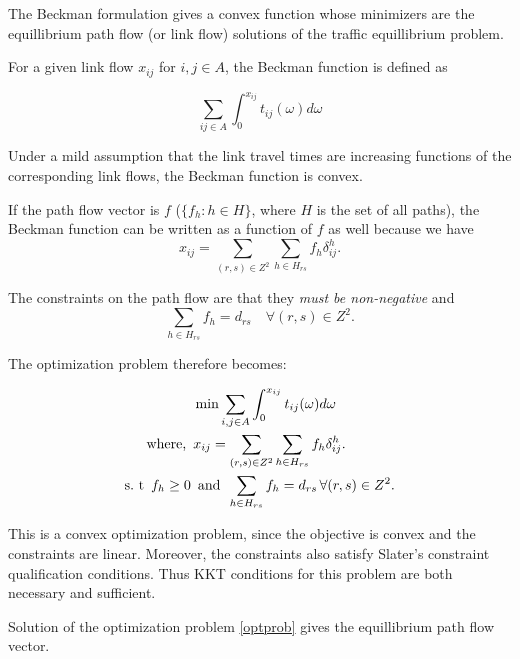 The Beckman formulation gives a convex function whose minimizers
are the equillibrium path flow (or link flow) solutions
of the traffic equillibrium problem.

For a given link flow $x_{ij}$ for $i,j\in A$, the Beckman function
is defined as

\begin{equation}\label{beck}
	\sum_{ij\in A}\int_{0}^{x_{ij}}t_{ij}(\omega)d\omega
\end{equation}

Under a mild assumption that the link travel times 
are increasing functions of the corresponding link flows,
the Beckman function is convex. %

If the path flow vector is $f$ ($\{f_h: h\in H\}$, where $H$ is the
set of all paths), the Beckman function can be written as a function
of $f$ as well because we have
\begin{equation}\label{linktopath}
	x_{ij} = \sum_{(r,s)\in Z^2}\sum_{h\in H_{rs}} f_h \delta_{ij}^h.
\end{equation}

The constraints on the path flow are that they
\emph{must be non-negative} and
\begin{equation}\label{pathconstr}
	\sum_{h\in H_{rs}} f_h = d_{rs} \quad \forall (r,s)\in Z^2.
\end{equation}


The optimization problem therefore becomes:

\begin{equation}\label{optprob}
\begin{split}
	&\min \sum_{i,j\in A}\int_{0}^{x_{ij}}t_{ij}(\omega)d\omega\hfill\\
	\text{where, } \, &x_{ij} =
	\sum_{(r,s)\in Z^2}\sum_{h\in H_{rs}} f_h \delta_{ij}^h.\\
	\text{s.\ t }\, f_h\geq 0\,&\text{ and }\,
	\sum_{h\in H_{rs}}f_h = d_{rs}\,\forall (r,s)\in Z^2.
\end{split}
\end{equation}

This is a convex optimization problem, since the objective is
convex and the constraints are linear. Moreover, the constraints
also satisfy Slater's constraint qualification conditions.
Thus KKT conditions for this problem are both necessary and
sufficient.

\begin{theorem}
	Solution of the optimization problem \eqref{optprob} gives
	the equillibrium path flow vector.
\end{theorem}

